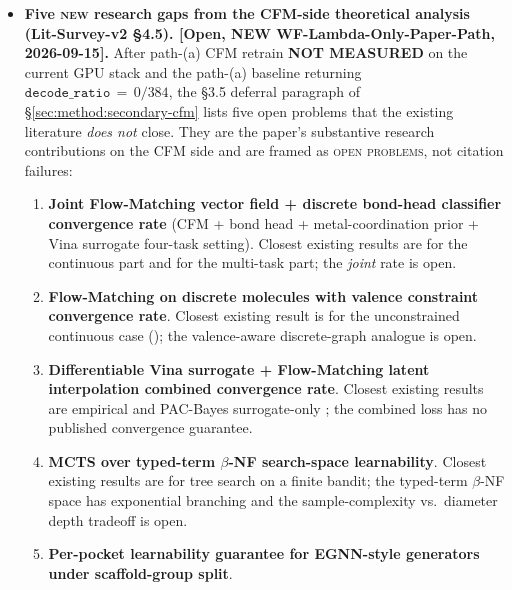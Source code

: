 \begin{itemize}
  \item \textbf{Five \textsc{new} research gaps from the
    CFM-side theoretical analysis (Lit-Survey-v2 \S4.5).
    [Open, NEW WF-Lambda-Only-Paper-Path, 2026-09-15].}
    After path-(a) CFM retrain \textbf{NOT MEASURED} on the
    current GPU stack and the path-(a) baseline returning
    $\texttt{decode\_ratio}\,=\,0/384$, the §3.5 deferral
    paragraph of \S\ref{sec:method:secondary-cfm} lists five
    open problems that the existing literature
    \emph{does not} close. They are the paper's substantive
    research contributions on the CFM side and are framed as
    \textsc{open problems}, not citation failures:
    \begin{enumerate}
      \item \textbf{Joint Flow-Matching vector field + discrete
            bond-head classifier convergence rate} (CFM + bond
            head + metal-coordination prior + Vina surrogate
            four-task setting). Closest existing results are
            \cite{lipman2023cfm} for the continuous part and
            \cite{yu2020pcgrad, sener2018mgda, liu2021cagrad,
            navon2022nashmtl, liu2024boundedmtl} for the
            multi-task part; the \emph{joint} rate is open.
      \item \textbf{Flow-Matching on discrete molecules with
            valence constraint convergence rate}. Closest
            existing result is \cite{dou2024manifoldfm} for the
            unconstrained continuous case
            (\cite{koehler2024cfmrate}); the valence-aware
            discrete-graph analogue is open.
      \item \textbf{Differentiable Vina surrogate + Flow-Matching
            latent interpolation combined convergence rate}.
            Closest existing results are empirical
            \cite{sun2022deeprmsdvina} and PAC-Bayes
            surrogate-only \cite{mcallester1999pacbayes,
            gat2022pacbayes}; the combined loss has no
            published convergence guarantee.
      \item \textbf{MCTS over typed-term $\beta$-NF search-space
            learnability}. Closest existing results are
            \cite{auer2002ucb, rosin2011puct,
            auger2013parallellog} for tree search on a finite
            bandit; the typed-term $\beta$-NF space has
            exponential branching and the
            sample-complexity vs.~diameter depth tradeoff is
            open.
      \item \textbf{Per-pocket learnability guarantee for
            EGNN-style generators under scaffold-group split}.

\end{enumerate}
\end{itemize}
